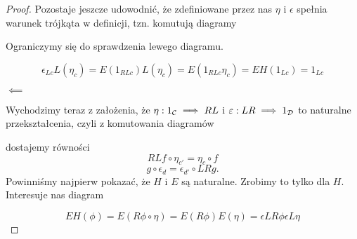 \begin{proof}
  Pozostaje jeszcze udowodnić, że zdefiniowane przez nas $\eta$ i $\epsilon$ spełnia warunek trójkąta w definicji, tzn. komutują diagramy
  \begin{center}
  \end{center}
  Ograniczymy się do sprawdzenia lewego diagramu. 
  \begin{center}
  \end{center}
  $$\epsilon_{Lc}L(\eta_c)=E(1_{RLc})L(\eta_c)=E(1_{RLc}\eta_c)=EH(1_{Lc})=1_{Lc}$$


  $\impliedby$

  Wychodzimy teraz z założenia, że $\eta:1_{\mathcal{C}}\implies RL$ i $\varepsilon:LR\implies 1_{\mathcal{D}}$ to naturalne przekształcenia, czyli z komutowania diagramów
  \begin{center}
  \end{center}
  dostajemy równości
  $$RLf\circ \eta_{c'}=\eta_c\circ f$$
  $$g\circ \epsilon_d=\epsilon_{d'}\circ LR g.$$
  Powinniśmy najpierw pokazać, że $H$ i $E$ są naturalne. Zrobimy to tylko dla $H$. Interesuje nas diagram
  \begin{center}
  \end{center}

  $$EH(\phi)=E(R\phi\circ \eta)=E(R\phi)E(\eta)=\epsilon LR\phi \epsilon L\eta$$
\end{proof}

